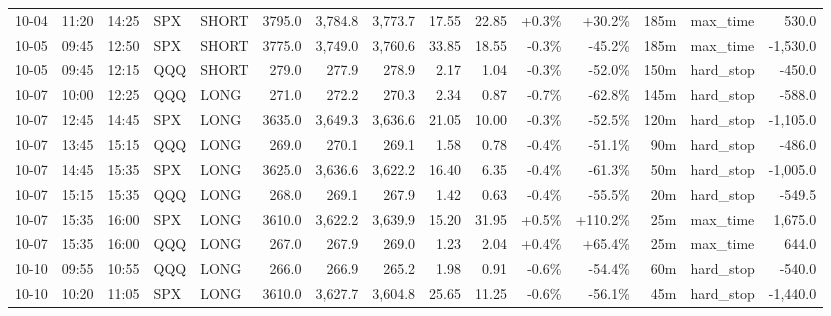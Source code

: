 \documentclass[11pt,a4paper,twoside]{article}
\begin{document}
\begin{landscape}
\begin{center}
\begin{longtable}{>{\color{txtmain}}l l l l l r r r r r r r r >{\color{txtmain}}l r}
10-04 & 11:20 & 14:25 & SPX & SHORT & 3795.0 & 3,784.8 & 3,773.7 & 17.55 & 22.85 & \textcolor{wingreen}{+0.3\%} & \textcolor{wingreen}{+30.2\%} & 185m & max\_time & \textcolor{wingreen}{530.0} \\
10-05 & 09:45 & 12:50 & SPX & SHORT & 3775.0 & 3,749.0 & 3,760.6 & 33.85 & 18.55 & \textcolor{lossred}{-0.3\%} & \textcolor{lossred}{-45.2\%} & 185m & max\_time & \textcolor{lossred}{-1,530.0} \\
10-05 & 09:45 & 12:15 & QQQ & SHORT & 279.0 & 277.9 & 278.9 & 2.17 & 1.04 & \textcolor{lossred}{-0.3\%} & \textcolor{lossred}{-52.0\%} & 150m & hard\_stop & \textcolor{lossred}{-450.0} \\
10-07 & 10:00 & 12:25 & QQQ & LONG & 271.0 & 272.2 & 270.3 & 2.34 & 0.87 & \textcolor{lossred}{-0.7\%} & \textcolor{lossred}{-62.8\%} & 145m & hard\_stop & \textcolor{lossred}{-588.0} \\
10-07 & 12:45 & 14:45 & SPX & LONG & 3635.0 & 3,649.3 & 3,636.6 & 21.05 & 10.00 & \textcolor{lossred}{-0.3\%} & \textcolor{lossred}{-52.5\%} & 120m & hard\_stop & \textcolor{lossred}{-1,105.0} \\
10-07 & 13:45 & 15:15 & QQQ & LONG & 269.0 & 270.1 & 269.1 & 1.58 & 0.78 & \textcolor{lossred}{-0.4\%} & \textcolor{lossred}{-51.1\%} & 90m & hard\_stop & \textcolor{lossred}{-486.0} \\
10-07 & 14:45 & 15:35 & SPX & LONG & 3625.0 & 3,636.6 & 3,622.2 & 16.40 & 6.35 & \textcolor{lossred}{-0.4\%} & \textcolor{lossred}{-61.3\%} & 50m & hard\_stop & \textcolor{lossred}{-1,005.0} \\
10-07 & 15:15 & 15:35 & QQQ & LONG & 268.0 & 269.1 & 267.9 & 1.42 & 0.63 & \textcolor{lossred}{-0.4\%} & \textcolor{lossred}{-55.5\%} & 20m & hard\_stop & \textcolor{lossred}{-549.5} \\
10-07 & 15:35 & 16:00 & SPX & LONG & 3610.0 & 3,622.2 & 3,639.9 & 15.20 & 31.95 & \textcolor{wingreen}{+0.5\%} & \textcolor{wingreen}{+110.2\%} & 25m & max\_time & \textcolor{wingreen}{1,675.0} \\
10-07 & 15:35 & 16:00 & QQQ & LONG & 267.0 & 267.9 & 269.0 & 1.23 & 2.04 & \textcolor{wingreen}{+0.4\%} & \textcolor{wingreen}{+65.4\%} & 25m & max\_time & \textcolor{wingreen}{644.0} \\
10-10 & 09:55 & 10:55 & QQQ & LONG & 266.0 & 266.9 & 265.2 & 1.98 & 0.91 & \textcolor{lossred}{-0.6\%} & \textcolor{lossred}{-54.4\%} & 60m & hard\_stop & \textcolor{lossred}{-540.0} \\
10-10 & 10:20 & 11:05 & SPX & LONG & 3610.0 & 3,627.7 & 3,604.8 & 25.65 & 11.25 & \textcolor{lossred}{-0.6\%} & \textcolor{lossred}{-56.1\%} & 45m & hard\_stop & \textcolor{lossred}{-1,440.0} \\

\end{longtable}
\end{center}
\end{landscape}
\end{document}
